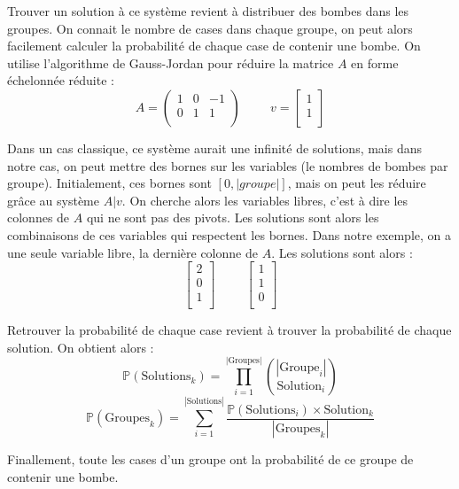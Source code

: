 Trouver un solution à ce système revient à distribuer des bombes dans les groupes. On connait le nombre de cases dans chaque groupe, on peut alors facilement calculer la probabilité de chaque case de contenir une bombe.
\newline
\newline
On utilise l'algorithme de Gauss-Jordan pour réduire la matrice $A$ en forme échelonnée réduite :
\[
    A = \begin{pmatrix}
        1 & 0 & -1 \\
        0 & 1 & 1 \\
    \end{pmatrix}
    \hspace{1cm}
    v = \begin{bmatrix} 1 \\1 \\ \end{bmatrix}
\]

Dans un cas classique, ce système aurait une infinité de solutions, mais dans notre cas, on peut mettre des bornes sur les variables (le nombres de bombes par groupe).
Initialement, ces bornes sont $[0, |groupe|]$, mais on peut les réduire grâce au système $A|v$.
\newline
On cherche alors les variables libres, c'est à dire les colonnes de $A$ qui ne sont pas des pivots. Les solutions sont alors les combinaisons de ces variables qui respectent les bornes.
\newpage
Dans notre exemple, on a une seule variable libre, la dernière colonne de $A$. Les solutions sont alors :
\[
    \begin{bmatrix} 2 \\0 \\1 \\ \end{bmatrix}
    \hspace{1cm}
    \begin{bmatrix} 1 \\1 \\0 \\ \end{bmatrix}
\]

Retrouver la probabilité de chaque case revient à trouver la probabilité de chaque solution. On obtient alors :
\[
    \mathbb{P}(\text{Solutions}_k) = \prod_{i=1}^{|\text{Groupes}|} \binom{|\text{Groupe}_i|}{\text{Solution}_i}
\]
\[
    \mathbb{P}(\text{Groupes}_k) = \sum_{i=1}^{|\text{Solutions}|} \frac{\mathbb{P}(\text{Solutions}_i) \times \text{Solution}_k}{|\text{Groupes}_k|}
\]

Finallement, toute les cases d'un groupe ont la probabilité de ce groupe de contenir une bombe.